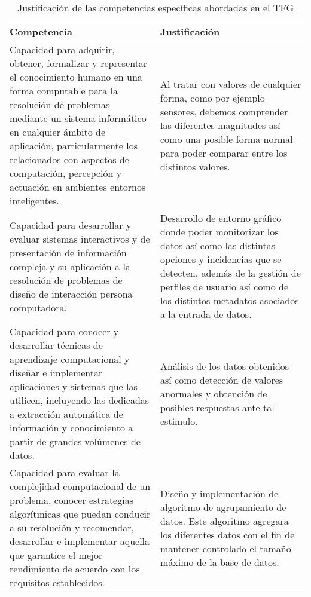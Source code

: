 \documentclass{pre-tfg}
\begin{document}
\begin{table}[hp]
  \centering
  \caption{Justificación de las competencias específicas abordadas en el TFG}
  \label{tab:competencias}

  \begin{tabular}{p{0.5\linewidth}p{0.5\linewidth}}
    \textbf{Competencia} & \textbf{Justificación} \\
    \hline
    Capacidad para adquirir, obtener, formalizar y representar el conocimiento humano en
    una forma computable para la resolución de problemas mediante un sistema informático
    en cualquier ámbito de aplicación, particularmente los relacionados con aspectos de
    computación, percepción y actuación en ambientes entornos inteligentes.
    & Al tratar con valores de cualquier forma, como por ejemplo
    sensores, debemos comprender las diferentes magnitudes así como una
    posible forma normal para poder comparar entre los distintos valores.\\
    Capacidad para desarrollar y evaluar sistemas interactivos y de
    presentación de información compleja y su aplicación a la resolución
    de problemas de diseño de interacción persona computadora.
    & Desarrollo de entorno gráfico donde poder monitorizar los datos
    así como las distintas opciones y incidencias que se detecten,
    además de la gestión de perfiles de usuario así como de los
    distintos metadatos asociados a la entrada de datos.\\
    Capacidad para conocer y desarrollar técnicas de aprendizaje computacional y diseñar e
    implementar aplicaciones y sistemas que las utilicen, incluyendo las dedicadas a
    extracción automática de información y conocimiento a partir de grandes volúmenes de
    datos.
    & Análisis de los datos obtenidos así como  detección de valores anormales y obtención
    de posibles respuestas ante tal estimulo.\\
    Capacidad para evaluar la complejidad computacional de un problema, conocer
    estrategias algorítmicas que puedan conducir a su resolución y recomendar, desarrollar
    e implementar aquella que garantice el mejor rendimiento de acuerdo con los requisitos
    establecidos.
    & Diseño y implementación de algoritmo de agrupamiento de datos. Este algoritmo
    agregara los diferentes datos con el fin de mantener controlado el tamaño máximo de la
    base de datos.\\
    \hline
  \end{tabular}
\end{table}
 \clearpage
\end{document}
